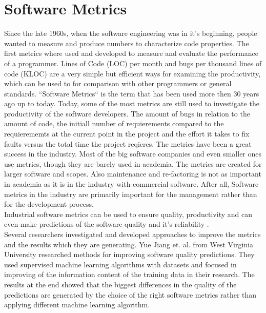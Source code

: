 \section{Software Metrics}
Since the late 1960s, when the software engineering was in it's beginning, people wanted to measure and produce numbers to characterize code properties. 
The first metrics where used and developed to measure and evaluate the performance of a programmer. Lines of Code (LOC) per month and bugs per thousand lines of code (KLOC) are a very simple but efficient ways for examining the productivity, which can be used to for comparison with other programmers or general standards.
\bigbreak
``Software Metrics`` is the term that has been used more then 30 years ago up to today.
Today, some of the most metrics are still used to investigate the productivity of the software developers. The amount of bugs in relation to the amount of code, the initiall number of requierements compared to the requierememts at the current point in the project and the effort it takes to fix faults versus the total time the project reqieres. \cite{kaner2004software}
The metrics have been a great success in the industry. Most of the big software companies and even smaller ones use metrics, though they are barely used in academia. 
The metrics are created for larger software and scopes. Also maintenance and re-factoring is not as important in academia as it is in the industry with commercial software. After all, Software metrics in the industry are primarily important for the management rather than for the development process.\\
Industrial software metrics can be used to ensure quality, productivity and can even make predictions of the software quality and it's reliability \cite{fenton1999software}.\\
Several researchers investigated and developed approaches to improve the metrics and the results which they are generating. 
Yue Jiang et. al. \cite{jiang2008comparing} from West Virginia University researched methods for improving software quality predictions. They used supervised machine learning algorithms with datasets and focused in improving of the information content of the training data in their research. The results at the end showed that the biggest differences in the quality of the predictions are generated by the choice of the right software metrics rather than applying different machine learning algorithm. 

